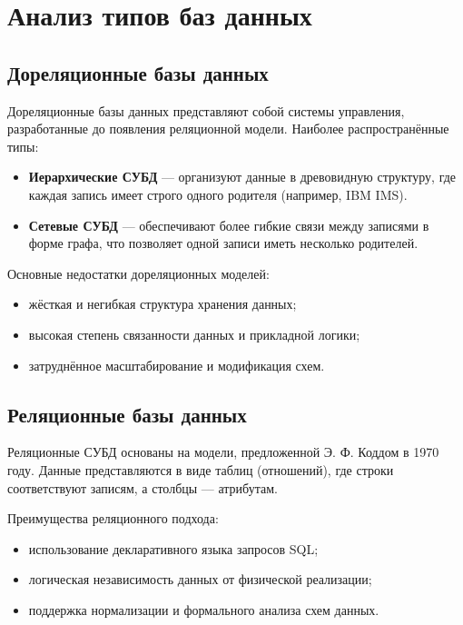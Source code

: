 \section{Анализ типов баз данных}

\subsection{Дореляционные базы данных}

Дореляционные базы данных представляют собой системы управления, разработанные до появления реляционной модели. Наиболее распространённые типы:

\begin{itemize}
    \item \textbf{Иерархические СУБД} — организуют данные в древовидную структуру, где каждая запись имеет строго одного родителя (например, IBM IMS).
    \item \textbf{Сетевые СУБД} — обеспечивают более гибкие связи между записями в форме графа, что позволяет одной записи иметь несколько родителей.
\end{itemize}

Основные недостатки дореляционных моделей:
\begin{itemize}
    \item жёсткая и негибкая структура хранения данных;
    \item высокая степень связанности данных и прикладной логики;
    \item затруднённое масштабирование и модификация схем.
\end{itemize}

\subsection{Реляционные базы данных}

Реляционные СУБД основаны на модели, предложенной Э. Ф. Коддом в 1970 году. Данные представляются в виде таблиц (отношений), где строки соответствуют записям, а столбцы — атрибутам.

Преимущества реляционного подхода:
\begin{itemize}
    \item использование декларативного языка запросов SQL;
    \item логическая независимость данных от физической реализации;
    \item поддержка нормализации и формального анализа схем данных.
\end{itemize}

